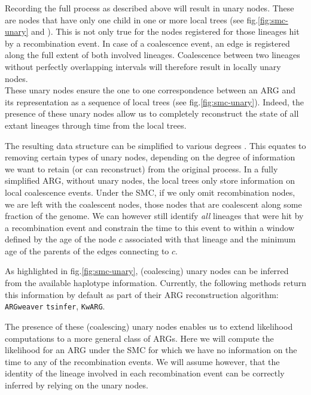 \documentclass{article}
\newcommand{\tsinfer}[0]{\texttt{tsinfer}}
\newcommand{\kwarg}[0]{\texttt{KwARG}}
\newcommand{\argweaver}[0]{\texttt{ARGweaver}}
\begin{document}
Recording the full process as described above will result in unary nodes.
These are nodes that have only one child in one or more local trees 
(see fig.\ref{fig:smc-unary} and \citet{Wong-2023}). This is not only true 
for the nodes registered for those lineages hit by a recombination event. 
In case of a coalescence event, an edge is registered along the full 
extent of both involved lineages. 
Coalescence between two lineages without perfectly 
overlapping intervals will therefore result in locally unary nodes.\\

These unary nodes ensure the one to one correspondence between an ARG and its 
representation as a sequence of local trees (see fig.\ref{fig:smc-unary}). 
Indeed, the presence of these unary nodes allow us to completely reconstruct 
the state of all extant lineages through time from the local trees. 


The resulting data structure can be simplified to various degrees \citep{Wong-2023}. 
This equates to removing certain types of unary nodes, 
depending on the degree of information 
we want to retain (or can reconstruct) from the original process. 
In a fully simplified ARG, without unary nodes, 
the local trees only store information on local coalescence events.
Under the SMC, if we only omit recombination nodes, %
we are left with the coalescent nodes, those nodes that are coalescent 
along some fraction of the genome. We can however still identify \emph{all} 
lineages that were hit by a recombination event and constrain the time to 
this event to within a window defined by the age of the node $c$ associated with that 
lineage and the minimum age of the parents of the edges connecting to $c$.

As highlighted in fig.\ref{fig:smc-unary}, (coalescing) unary nodes can be inferred 
from the available haplotype information. Currently, the following methods 
return this information by default as part of their ARG reconstruction algorithm: 
\argweaver \citep{rasmussen_genome-wide_2014} 
\tsinfer \citep{kelleher_inferring_2019}, 
\kwarg \citep{ignatieva_kwarg_2021}.

The presence of these (coalescing) unary nodes enables us to extend likelihood 
computations to a more general class of ARGs.
Here we will compute the likelihood for an ARG
under the SMC for which we have no information on the time to any 
of the recombination events. 
We will assume however, that the identity 
of the lineage involved in each recombination event can be correctly 
inferred by relying on the unary nodes.
\end{document}

